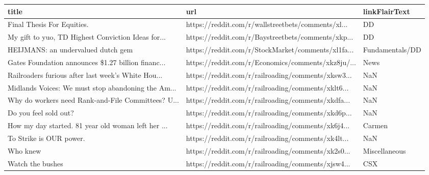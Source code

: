 \documentclass{article}%
\begin{document}
\begin{table}[htbp]%
\centering%
\begin{adjustbox}{width=1\textwidth}%
\begin{tabular}{lll}
\toprule
                                             title &                                                url &   linkFlairText \\
\midrule
                        Final Thesis For Equities. & https://reddit.com/r/wallstreetbets/comments/xl... &              DD \\
My gift to yuo, TD Highest Conviction Ideas for... & https://reddit.com/r/Baystreetbets/comments/xkp... &              DD \\
                HEIJMANS: an undervalued dutch gem & https://reddit.com/r/StockMarket/comments/xl1fa... & Fundamentals/DD \\
Gates Foundation announces \$1.27 billion financ... & https://reddit.com/r/Economics/comments/xkz8ju/... &            News \\
Railroaders furious after last week’s White Hou... & https://reddit.com/r/railroading/comments/xksw3... &             NaN \\
Midlands Voices: We must stop abandoning the Am... & https://reddit.com/r/railroading/comments/xklt6... &             NaN \\
Why do workers need Rank-and-File Committees? U... & https://reddit.com/r/railroading/comments/xkdfa... &             NaN \\
                             Do you feel sold out? & https://reddit.com/r/railroading/comments/xkd6p... &             NaN \\
How my day started. 81 year old woman left her ... & https://reddit.com/r/railroading/comments/xk6j4... &          Carmen \\
                           To Strike is OUR power. & https://reddit.com/r/railroading/comments/xk4lt... &             NaN \\
                                          Who knew & https://reddit.com/r/railroading/comments/xk2s0... &   Miscellaneous \\
                                  Watch the bushes & https://reddit.com/r/railroading/comments/xjsw4... &             CSX \\
\bottomrule
\end{tabular}
%
\end{adjustbox}%
\end{table}

%
\end{document}
